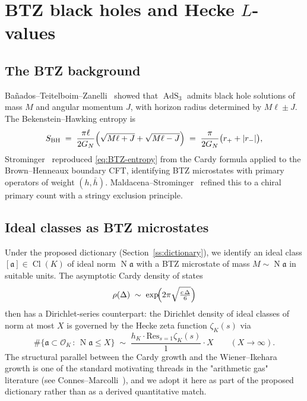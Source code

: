 \documentclass[11pt,a4paper]{amsart}
\theoremstyle{definition}
\DeclareMathOperator{\Cl}{Cl}
\DeclareMathOperator{\Nm}{N}
\DeclareMathOperator{\AdS}{AdS}
\newcommand{\OK}{\mathcal{O}_K}
\newcommand{\fa}{\mathfrak{a}}
\newcommand{\hK}{h_{K}}
\begin{document}
\section{BTZ black holes and Hecke $L$-values}\label{sec:BTZ-Hecke}

\subsection{The BTZ background}\label{ss:BTZ}

Ba\~nados--Teitelboim--Zanelli~\cite{BTZ1992} showed that $\AdS_3$ admits black hole
solutions of mass $M$ and angular momentum $J$, with horizon radius determined by
$M\ell \pm J$. The Bekenstein--Hawking entropy is
\begin{equation}\label{eq:BTZ-entropy}
  S_{\mathrm{BH}} \;=\; \frac{\pi \ell}{2 G_N}\Bigl( \sqrt{M\ell + J} + \sqrt{M\ell - J} \Bigr)
   \;=\; \frac{\pi}{2 G_N}\bigl( r_{+} + |r_{-}| \bigr),
\end{equation}
Strominger~\cite{Strominger1998} reproduced \eqref{eq:BTZ-entropy} from the Cardy formula
applied to the Brown--Henneaux boundary CFT, identifying BTZ microstates with primary
operators of weight $(h, \bar h)$. Maldacena--Strominger~\cite{MaldacenaStrominger1998}
refined this to a chiral primary count with a stringy exclusion principle.

\subsection{Ideal classes as BTZ microstates}\label{ss:BTZ-Hecke-anal}

Under the proposed dictionary (Section~\ref{ss:dictionary}), we identify an ideal class
$[\fa] \in \Cl(K)$ of ideal norm $\Nm\fa$ with a BTZ microstate of mass $M \sim \Nm\fa$
in suitable units. The asymptotic Cardy density of states
\[
  \rho(\Delta) \;\sim\; \exp\!\Bigl(2\pi \sqrt{\tfrac{c\, \Delta}{6}}\Bigr)
\]
then has a Dirichlet-series counterpart: the Dirichlet density of ideal classes of
norm at most $X$ is governed by the Hecke zeta function $\zeta_K(s)$ via
\[
  \#\{ \fa \subset \OK \,:\, \Nm\fa \le X \} \;\sim\; \frac{\hK \cdot \mathrm{Res}_{s=1}\zeta_K(s)}{1} \cdot X
  \qquad (X \to \infty).
\]
The structural parallel between the Cardy growth and the Wiener--Ikehara growth is one of
the standard motivating threads in the "arithmetic gas" literature (see
Connes--Marcolli~\cite{ConnesMarcolli2008}), and we adopt it here as part of the
proposed dictionary rather than as a derived quantitative match.
\end{document}
